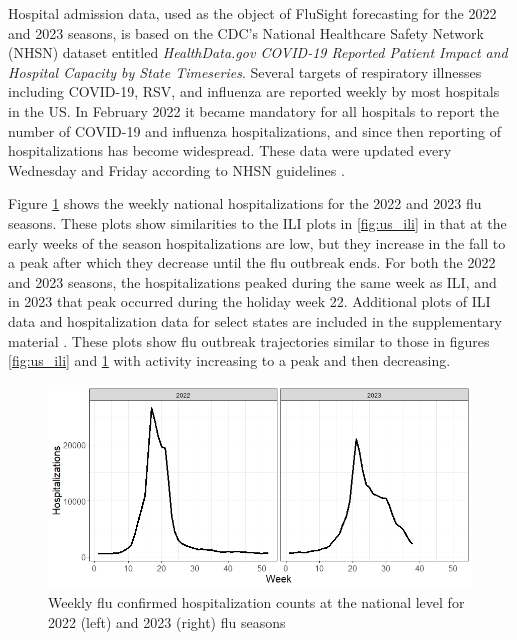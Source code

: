 \documentclass[ba]{imsart}
\theoremstyle{plain}
\theoremstyle{definition}
\theoremstyle{remark}
\begin{document}
Hospital admission data, used as the object of FluSight forecasting for the 2022 and 2023 seasons, is based on the CDC's National Healthcare Safety Network (NHSN) dataset entitled \textit{HealthData.gov COVID-19 Reported Patient Impact and Hospital Capacity by State Timeseries}. Several targets of respiratory illnesses including COVID-19, RSV, and influenza are reported weekly by most hospitals in the US. In February 2022 it became mandatory for all hospitals to report the number of COVID-19 and influenza hospitalizations, and since then reporting of hospitalizations has become widespread. These data were updated every Wednesday and Friday according to NHSN guidelines \cite[]{healthdata2024covidts}.

Figure \ref{fig:us_hosp} shows the weekly national hospitalizations for the 2022 and 2023 flu seasons. These plots show similarities to the ILI plots in \ref{fig:us_ili} in that at the early weeks of the season hospitalizations are low, but they increase in the fall to a peak after which they decrease until the flu outbreak ends. For both the 2022 and 2023 seasons, the hospitalizations peaked during the same week as ILI, and in 2023 that peak occurred during the holiday week 22. Additional plots of ILI data and hospitalization
data for select states are included in the supplementary material 
\cite[]{wadsworth2024bas}. These plots show flu outbreak trajectories similar to 
those in figures \ref{fig:us_ili} and \ref{fig:us_hosp} with activity increasing
to a peak and then decreasing.


\begin{figure}
    \centering
    \includegraphics[scale=.5]{Images/us_hospitalizations.png}
    \caption{Weekly flu confirmed hospitalization counts at the national level for 2022 (left) and 2023 (right) flu seasons}
    \label{fig:us_hosp}
\end{figure}
\end{document}
